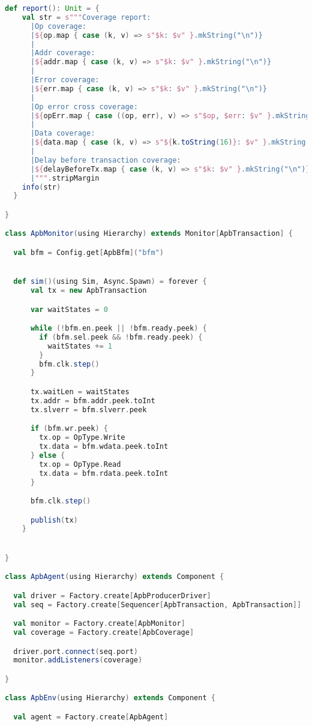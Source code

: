\begin{lstlisting}[language=scala, captionpos=b, caption=Test code for the APB Didactic SoC subsystem.,label=lst:apb_test]
  def report(): Unit = {
    val str = s"""Coverage report:
      |Op coverage:
      |${op.map { case (k, v) => s"$k: $v" }.mkString("\n")}
      |
      |Addr coverage:
      |${addr.map { case (k, v) => s"$k: $v" }.mkString("\n")}
      |
      |Error coverage:
      |${err.map { case (k, v) => s"$k: $v" }.mkString("\n")}
      |
      |Op error cross coverage:
      |${opErr.map { case ((op, err), v) => s"$op, $err: $v" }.mkString("\n")}
      |
      |Data coverage:
      |${data.map { case (k, v) => s"${k.toString(16)}: $v" }.mkString("\n")}
      |
      |Delay before transaction coverage:
      |${delayBeforeTx.map { case (k, v) => s"$k: $v" }.mkString("\n")}
      |""".stripMargin
    info(str)
  }

}

class ApbMonitor(using Hierarchy) extends Monitor[ApbTransaction] {

  val bfm = Config.get[ApbBfm]("bfm")


  def sim()(using Sim, Async.Spawn) = forever {
      val tx = new ApbTransaction

      var waitStates = 0

      while (!bfm.en.peek || !bfm.ready.peek) {
        if (bfm.sel.peek && !bfm.ready.peek) {
          waitStates += 1
        }
        bfm.clk.step()
      }

      tx.waitLen = waitStates
      tx.addr = bfm.addr.peek.toInt
      tx.slverr = bfm.slverr.peek

      if (bfm.wr.peek) {
        tx.op = OpType.Write
        tx.data = bfm.wdata.peek.toInt
      } else {
        tx.op = OpType.Read
        tx.data = bfm.rdata.peek.toInt
      }

      bfm.clk.step()

      publish(tx)
    }


}

class ApbAgent(using Hierarchy) extends Component {

  val driver = Factory.create[ApbProducerDriver]
  val seq = Factory.create[Sequencer[ApbTransaction, ApbTransaction]]

  val monitor = Factory.create[ApbMonitor]
  val coverage = Factory.create[ApbCoverage]

  driver.port.connect(seq.port)
  monitor.addListeners(coverage)

}

class ApbEnv(using Hierarchy) extends Component {

  val agent = Factory.create[ApbAgent]


\end{lstlisting}
